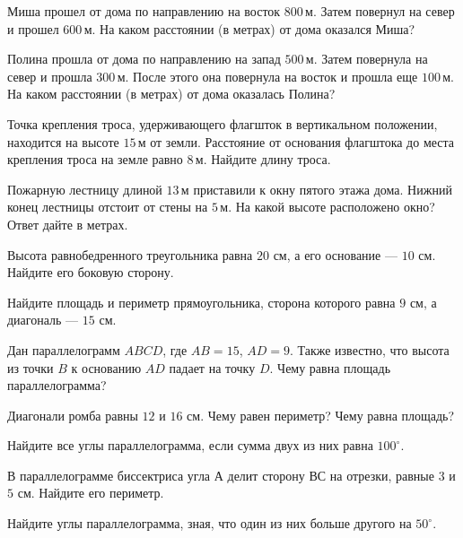 \begin{class}[number=2]
	\begin{listofex}
		\item Миша прошел от дома по направлению на восток \( 800 \) м. Затем повернул на север и прошел \( 600 \) м. На каком расстоянии (в метрах) от дома оказался Миша?
		\item Полина прошла от дома по направлению на запад \( 500 \) м. Затем повернула на север и прошла \( 300 \) м. После этого она повернула на восток и прошла еще \( 100 \) м. На каком расстоянии (в метрах) от дома оказалась Полина?
		\item Точка крепления троса, удерживающего флагшток в вертикальном положении, находится на высоте \( 15 \) м от земли. Расстояние от основания флагштока до места крепления троса на земле равно \( 8 \) м. Найдите длину троса.
		\item Пожарную лестницу длиной \( 13 \) м приставили к окну пятого этажа дома. Нижний конец лестницы отстоит от стены на \( 5 \) м. На какой высоте расположено окно? Ответ дайте в метрах.
		\item Высота равнобедренного треугольника равна \( 20 \) см, а его основание --- \( 10 \) см. Найдите его боковую сторону.
		\item Найдите площадь и периметр прямоугольника, сторона которого равна \( 9 \) см, а диагональ --- \( 15 \) см.
		\item Дан параллелограмм \( ABCD \), где \( AB=15 \), \( AD=9 \). Также известно, что высота из точки \( B \) к основанию \( AD \) падает на точку \( D \). Чему равна площадь параллелограмма?
		\item Диагонали ромба равны \( 12 \) и \( 16 \) см. Чему равен периметр? Чему равна площадь? 
		\item Найдите все углы параллелограмма, если сумма двух из них равна \( 100^{\circ}\).
		\item В параллелограмме биссектриса угла \( А \) делит сторону \( ВС  \) на отрезки, равные \( 3 \) и \( 5  \) см. Найдите его периметр.
		\item Найдите углы параллелограмма, зная, что один из них больше другого на \( 50^{\circ} \).
	\end{listofex}
\end{class}

